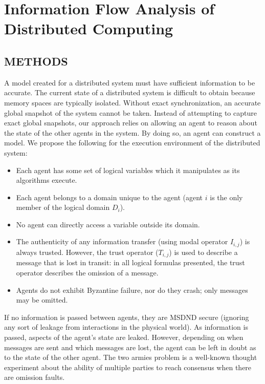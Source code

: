 

\chapter{Information Flow Analysis of Distributed Computing}


\section{METHODS}

A model created for a distributed system must have sufficient information to be accurate.
The current state of a distributed system is difficult to obtain because memory spaces are typically isolated.
Without exact synchronization, an accurate global snapshot of the system cannot be taken.
Instead of attempting to capture exact global snapshots, our approach relies on allowing an agent to reason about the state of the other agents in the system.
By doing so, an agent can construct a model.
We propose the following for the execution environment of the distributed system:

\begin{itemize}
    \item Each agent has some set of logical variables which it manipulates as its algorithms execute.
    \item Each agent belongs to a domain unique to the agent (agent $i$ is the only member of the logical domain $D_i$).
    \item No agent can directly access a variable outside its domain.
    \item The authenticity of any information transfer (using modal operator $I_{i,j}$) is always trusted. However, the trust operator ($T_{i,j}$) is used to describe a message that is lost in transit: in all logical formulas presented, the trust operator describes the omission of a message.
    \item Agents do not exhibit Byzantine failure, nor do they crash; only messages may be omitted.
\end{itemize}

If no information is passed between agents, they are MSDND secure (ignoring any sort of leakage from interactions in the physical world).
As information is passed, aspects of the agent's state are leaked.
However, depending on when messages are sent and which messages are lost, the agent can be left in doubt as to the state of the other agent.
The two armies problem is a well-known thought experiment about the ability of multiple parties to reach consensus when there are omission faults.

